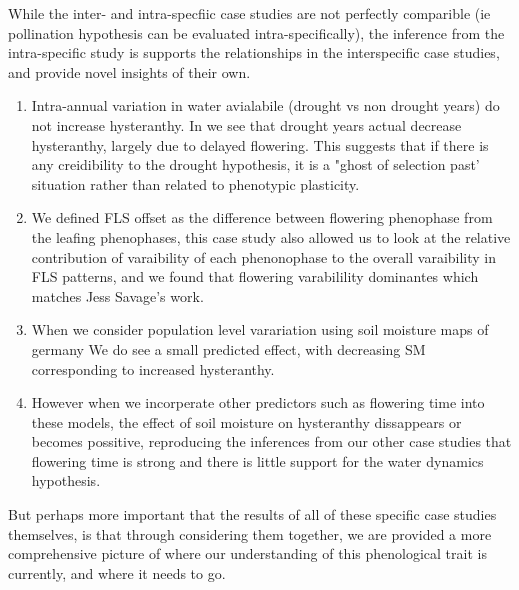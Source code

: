 \documentclass[12pt]{article}\usepackage[]{graphicx}\usepackage[]{color}
\begin{document}
\indent While the inter- and intra-specfiic case studies are not perfectly comparible (ie pollination hypothesis can be evaluated intra-specifically), the inference from the intra-specific study is supports the relationships in the interspecific case studies, and provide novel insights of their own.
\begin{enumerate}
\item Intra-annual variation in water avialabile (drought vs non drought years) do not increase hysteranthy. In we see that drought years actual decrease hysteranthy, largely due to delayed flowering. This suggests that if there is any creidibility to the drought hypothesis, it is a "ghost of selection past' situation rather than related to phenotypic plasticity.
\item We defined FLS offset as the difference between flowering phenophase from the leafing phenophases, this case study also allowed us to look at the relative contribution of varaibility of each phenonophase to the overall varaibility in FLS patterns, and we found that flowering varabilility dominantes which matches Jess Savage's work.
\item When we consider population level varariation using soil moisture maps of germany We do see a small predicted effect, with decreasing SM corresponding to increased hysteranthy.
\item However when we incorperate other predictors such as flowering time into these models, the effect of soil moisture on hysteranthy dissappears or becomes possitive, reproducing the inferences from our other case studies that flowering time is strong and there is little support for the water dynamics hypothesis. 
\end{enumerate}
But perhaps more important that the results of all of these specific case studies themselves, is that through considering them together, we are provided a more comprehensive picture of where our understanding of this phenological trait is currently, and where it needs to go. 
\end{document}
